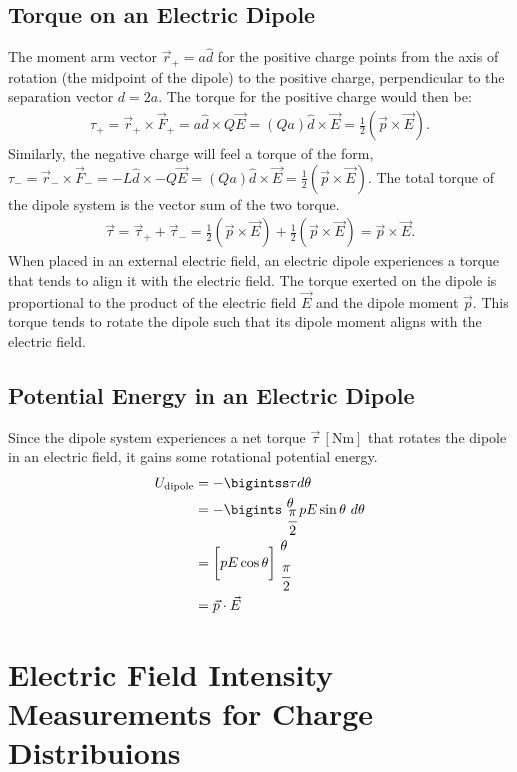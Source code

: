 \documentclass[12pt,b4paper]{article}
\begin{document}
\subsection{Torque on an Electric Dipole}
The moment arm vector $\vec{r}_+=a\hat{d}$ for the positive charge points from the axis of rotation (the midpoint of the dipole) to the positive charge, perpendicular to the separation vector $d=2a$. The torque for the positive charge would then be:
\begin{align}
    \tau_+=\vec{r}_+\times\vec{F}_+=a\hat{d}\times Q\vec{E}=(Qa)\hat{d}\times\vec{E}=\frac{1}{2}\left(\vec{p}\times\vec{E}\right).
\end{align}
Similarly, the negative charge will feel a torque of the form, $\displaystyle\tau_-=\vec{r}_-\times\vec{F}_-=-L\hat{d}\times -Q\vec{E}=(Qa)\hat{d}\times\vec{E}=\frac{1}{2}\left(\vec{p}\times\vec{E}\right)$. The total torque of the dipole system is the vector sum of the two torque.
\begin{align}
    \vec{\tau}=\vec{\tau}_++\vec{\tau}_-=\frac{1}{2}\left(\vec{p}\times\vec{E}\right)+\frac{1}{2}\left(\vec{p}\times\vec{E}\right)=\vec{p}\times\vec{E}.
\end{align}
When placed in an external electric field, an electric dipole experiences a torque that tends to align it with the electric field. The torque exerted on the dipole is proportional to the product of the electric field $\vec{E}$ and the dipole moment $\Vec{p}$. This torque tends to rotate the dipole such that its dipole moment aligns with the electric field.
\subsection{Potential Energy in an Electric Dipole}
Since the dipole system experiences a net torque $\vec{\tau}\,[\unit{\newton\meter}]$ that rotates the dipole in an electric field, it gains some rotational potential energy. 
\begin{align}
    U_\text{dipole}&=-\bigintss\tau d\theta\notag\\
    &=-\bigints_{\displaystyle\,\,\frac{\pi}{2}}^{\displaystyle\,\,\theta}pE\sin\theta\,\,d\theta\notag\\
    &=\bigg[pE\cos\theta\bigg]_{\displaystyle\,\,\frac{\pi}{2}}^{\displaystyle\,\,\theta}\notag\\
    &=\vec{p}\cdot\vec{E}
\end{align}
\section{Electric Field Intensity Measurements for Charge Distribuions}
\end{document}
